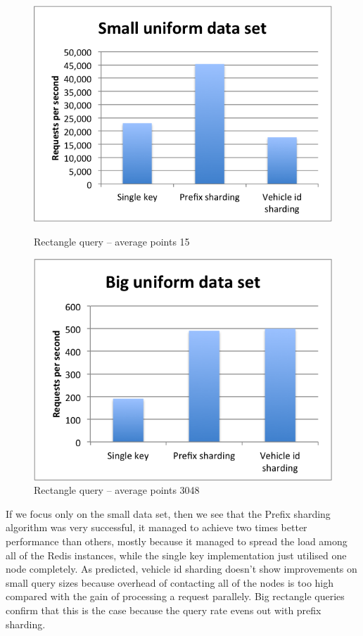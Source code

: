 \documentclass[times, utf8, diplomski]{fer}
\begin{document}
\begin{figure}[h]
\includegraphics[width=\textwidth]{rectangle_small_uniform}
\caption{Rectangle query -- average points 15}
\label{small_uniform}
\endminipage\hfill
{}
\includegraphics[width=\textwidth]{rectangle_big_uniform}
\caption{Rectangle query -- average points 3048}
\label{big_uniform}
\endminipage\hfill
\end{figure}

If we focus only on the small data set, then we see that the Prefix sharding algorithm was very successful, it managed to achieve two times better performance than others, mostly because it managed to spread the load among all of the Redis instances, while the single key implementation just utilised one node completely. As predicted, vehicle id sharding doesn't show improvements on small query sizes because overhead of contacting all of the nodes is too high compared with the gain of processing a request parallely. Big rectangle queries confirm that this is the case because the query rate evens out with prefix sharding.
\end{document}
